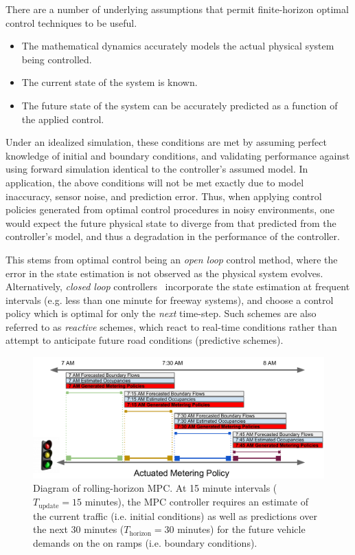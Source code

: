 There are a number of underlying assumptions that permit finite-horizon optimal control techniques to be useful.

\begin{itemize}
	\item The mathematical dynamics accurately models the actual physical system being controlled.
	\item The current state of the system is known.
	\item The future state of the system can be accurately predicted as a function of the applied control.
\end{itemize}

Under an idealized simulation, these conditions are met by assuming perfect knowledge of initial and boundary conditions, and validating performance against using forward simulation identical to the controller's assumed model. In application, the above conditions will not be met exactly due to model inaccuracy, sensor noise, and prediction error. Thus, when applying control policies generated from optimal control procedures in noisy environments, one would expect the future physical state to diverge from that predicted from the controller's model, and thus a degradation in the performance of the controller.

This stems from optimal control being an \emph{open loop} control method, where the error in the state estimation is not observed as the physical system evolves. Alternatively, \emph{closed loop} controllers~\cite{Papageorgiou1991,Papamichail} incorporate the state estimation at frequent intervals (e.g. less than one minute for freeway systems), and choose a control policy which is optimal for only the \emph{next} time-step. Such schemes are also referred to as \emph{reactive} schemes, which react to real-time conditions rather than attempt to anticipate future road conditions (predictive schemes).

\begin{figure}[htbp]
	\centering
	\includegraphics[width=\textwidth]{diagrams/mpc}
	\caption[Diagram of rolling-horizon MPC.]{Diagram of rolling-horizon MPC. At 15 minute intervals ($T_{\text{update}} =15$ minutes), the MPC controller requires an estimate of the current traffic (i.e. initial conditions) as well as predictions over the next 30 minutes ($T_{\text{horizon}} = 30$ minutes) for the future vehicle demands on the on ramps (i.e. boundary conditions).
	}
	\label{fig:mpc-overview}
\end{figure}

